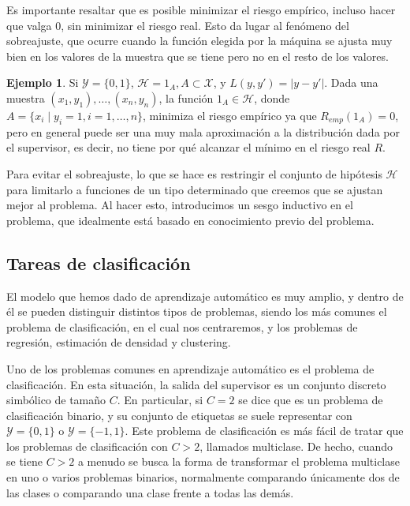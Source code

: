 \documentclass[a4paper,12pt]{report}
\theoremstyle{definition}
\newtheorem{example}{Ejemplo}
\begin{document}
Es importante resaltar que es posible minimizar el riesgo empírico, incluso hacer que valga 0, sin minimizar el riesgo real. Esto da lugar al fenómeno del sobreajuste, que ocurre cuando la función elegida por la máquina se ajusta muy bien en los valores de la muestra que se tiene pero no en el resto de los valores.

\begin{example}
  \label{ex:overfitting}
  Si $\mathcal{Y} = \lbrace 0, 1 \rbrace$, $\mathcal{H} = 1_A, A \subset \mathcal{X}$, y $L(y, y') = \lvert y-y' \rvert$. Dada una muestra $(x_1, y_1), \ldots, (x_n, y_n)$, la función $1_A \in \mathcal{H}$, donde $A = \lbrace x_i \mid y_i = 1, i = 1, \ldots, n \rbrace$, minimiza el riesgo empírico ya que $R_{emp}(1_A) = 0$, pero en general puede ser una muy mala aproximación a la distribución dada por el supervisor, es decir, no tiene por qué alcanzar el mínimo en el riesgo real $R$.
\end{example}

Para evitar el sobreajuste, lo que se hace es restringir el conjunto de hipótesis $\mathcal{H}$ para limitarlo a funciones de un tipo determinado que creemos que se ajustan mejor al problema. Al hacer esto, introducimos un sesgo inductivo en el problema, que idealmente está basado en conocimiento previo del problema.

\subsection{Tareas de clasificación}
El modelo que hemos dado de aprendizaje automático es muy amplio, y dentro de él se pueden distinguir distintos tipos de problemas, siendo los más comunes el problema de clasificación, en el cual nos centraremos, y los problemas de regresión, estimación de densidad y clustering.

Uno de los problemas comunes en aprendizaje automático es el problema de clasificación. En esta situación, la salida del supervisor es un conjunto discreto simbólico de tamaño $C$. En particular, si $C = 2$ se dice que es un problema de clasificación binario, y su conjunto de etiquetas se suele representar con $\mathcal{Y} = \lbrace 0, 1 \rbrace$ o $\mathcal{Y} = \lbrace -1, 1 \rbrace$. Este problema de clasificación es más fácil de tratar que los problemas de clasificación con $C > 2$, llamados multiclase. De hecho, cuando se tiene $C > 2$ a menudo se busca la forma de transformar el problema multiclase en uno o varios problemas binarios, normalmente comparando únicamente dos de las clases o comparando una clase frente a todas las demás.
\end{document}
